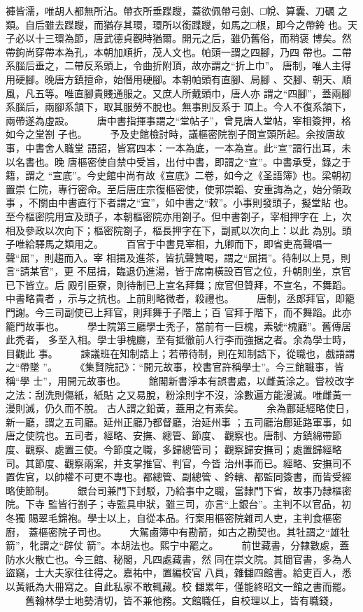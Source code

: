 \documentclass{ctexart}
\begin{document}
褲皆濡，唯胡人都無所沾。帶衣所垂蹀躞，蓋欲佩帶弓劍、□帨、算囊、刀礪 之類。自后雖去蹀躞，而猶存其環，環所以銜蹀躞，如馬之□根，即今之帶銙 也。天子必以十三環為節，唐武德貞觀時猶爾。開元之后，雖仍舊俗，而稍褒 博矣。然帶鉤尚穿帶本為孔，本朝加順折，茂人文也。帕頭一謂之四腳，乃四 帶也。二帶系腦后垂之，二帶反系頭上，令曲折附頂，故亦謂之``折上巾''。 唐制，唯人主得用硬腳。晚唐方鎮擅命，始僭用硬腳。本朝帕頭有直腳、局腳 、交腳、朝天、順風，凡五等。唯直腳貴賤通服之。又庶人所戴頭巾，唐人亦 謂之``四腳''，蓋兩腳系腦后，兩腳系頷下，取其服勞不脫也。無事則反系于 頂上。今人不復系頷下，兩帶遂為虛設。 　　唐中書指揮事謂之``堂帖子''，曾見唐人堂帖，宰相簽押，格如今之堂劄 子也。 　　予及史館檢討時，議樞密院劄子問宣頭所起。余按唐故事，中書舍人職堂 語詔，皆寫四本：一本為底，一本為宣。此``宣''謂行出耳，未以名書也。晚 唐樞密使自禁中受旨，出付中書，即謂之``宣''。中書承受，錄之于籍，謂之 ``宣底''。今史館中尚有故《宣底》二卷，如今之《圣語簿》也。梁朝初置崇 仁院，專行密命。至后唐庄宗復樞密使，使郭崇韜、安重誨為之，始分領政事 ，不關由中書直行下者謂之``宣''，如中書之``敕''。小事則發頭子，擬堂貼 也。至今樞密院用宣及頭子，本朝樞密院亦用劄子。但中書劄子，宰相押字在 上，次相及參政以次向下；樞密院劄子，樞長押字在下，副貳以次向上：以此 為別。頭子唯給驛馬之類用之。 　　百官于中書見宰相，九卿而下，即省吏高聲唱一聲``屈''，則趨而入。宰 相揖及進茶，皆抗聲贊喝，謂之``屈揖''。待制以上見，則言``請某官''，更 不屈揖，臨退仍進湯，皆于席南橫設百官之位，升朝則坐，京官已下皆立。后 殿引臣寮，則待制已上宣名拜舞；庶官但贊拜，不宣名，不舞蹈。中書略貴者 ，示与之抗也。上前則略微者，殺禮也。 　　唐制，丞郎拜官，即籠門謝。今三司副使已上拜官，則拜舞于子階上；百 官拜于階下，而不舞蹈。此亦籠門故事也。 　　學士院第三廳學士秃子，當前有一巨槐，素號``槐廳''。舊傳居此秃者， 多至入相。學士爭槐廳，至有抵徹前人行李而強据之者。余為學士時，目觀此 事。 　　諫議班在知制誥上；若帶待制，則在知制誥下，從職也，戲語謂之``帶墜 ''。 　　《集賢院記》：``開元故事，校書官許稱學士''。今三館職事，皆稱``學 士''，用開元故事也。 　　館閣新書淨本有誤書處，以雌黃涂之。嘗校改字之法：刮洗則傷紙，紙貼 之又易脫，粉涂則字不沒，涂數遍方能漫滅。唯雌黃一漫則滅，仍久而不脫。 古人謂之鉛黃，蓋用之有素矣。 　　余為鄜延經略使日，新一廳，謂之五司廳。延州正廳乃都督廳，治延州事 ；五司廳治鄜延路軍事，如唐之使院也。五司者，經略、安撫、總管、節度、 觀察也。唐制、方鎮綿帶節度、觀察、處置三使。今節度之職，多歸總管司； 觀察歸安撫司；處置歸經略司。其節度、觀察兩案，并支掌推官、判官，今皆 治州事而已。經略、安撫司不置佐官，以帥權不可更不專也。都總管、副總管 、鈐轄、都監同簽書，而皆受經略使節制。 　　銀台司兼門下封駁，乃給事中之職，當隸門下省，故事乃隸樞密院。下寺 監皆行劄子；寺監具申狀，雖三司，亦言``上銀台''。主判不以官品，初冬獨 賜翠毛錦袍。學士以上，自從本品。行案用樞密院雜司人吏，主判食樞密廚， 蓋樞密院子司也。 　　大駕鹵簿中有勘箭，如古之勘契也。其牡謂之``雄牡箭''，牝謂之``辟仗 箭''。本胡法也。熙宁中罷之。 　　前世藏書，分隸數處，蓋防水火散亡也。今三館、秘閣，凡四處藏書，然 同在崇文院。其間官書，多為人盜竊，士大夫家往往得之。嘉祐中，置編校官 八員，雜讎四館書。給吏百人，悉以黃紙為大冊寫之。自此私家不敢輒藏。校 讎累年，僅能終昭文一館之書而罷。 　　舊翰林學士地勢清切，皆不兼他務。文館職任，自校理以上，皆有職錢， 
\end{document}
